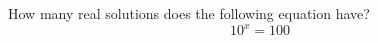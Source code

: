 \documentclass{ximera}
\author{David Kish}
\begin{document}
\begin{exercise}
How many real solutions does the following equation have? \\
\[
10^x=100
\]
\begin{multipleChoice}  
\end{multipleChoice}  
\end{exercise}
\end{document}
